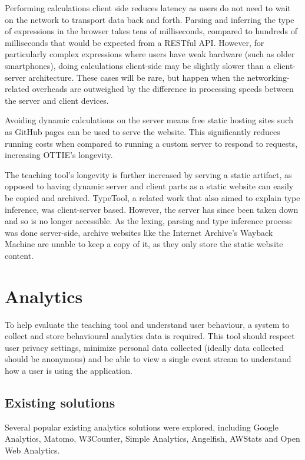 \documentclass[a4paper,fleqn,oneside,12pt]{report}
\begin{document}
Performing calculations client side reduces latency as users do not need to wait on the network to transport data back and forth. Parsing and inferring the type of expressions in the browser takes tens of milliseconds, compared to hundreds of milliseconds that would be expected from a RESTful API. However, for particularly complex expressions where users have weak hardware (such as older smartphones), doing calculations client-side may be slightly slower than a client-server architecture. These cases will be rare, but happen when the networking-related overheads are outweighed by the difference in processing speeds between the server and client devices.

Avoiding dynamic calculations on the server means free static hosting sites such as GitHub pages can be used to serve the website. This significantly reduces running costs when compared to running a custom server to respond to requests, increasing OTTIE's longevity.

The teaching tool’s longevity is further increased by serving a static artifact, as opposed to having dynamic server and client parts as a static website can easily be copied and archived. TypeTool, a related work that also aimed to explain type inference, was client-server based. However, the server has since been taken down and so is no longer accessible. As the lexing, parsing and type inference process was done server-side, archive websites like the Internet Archive’s Wayback Machine are unable to keep a copy of it, as they only store the static website content.

\section{Analytics}\label{id:h.60njhv340fb0}

To help evaluate the teaching tool and understand user behaviour, a system to collect and store behavioural analytics data is required. This tool should respect user privacy settings, minimize personal data collected (ideally data collected should be anonymous) and be able to view a single event stream to understand how a user is using the application.

\subsection{Existing solutions}

Several popular existing analytics solutions were explored, including Google Analytics, Matomo, W3Counter, Simple Analytics, Angelfish, AWStats and Open Web Analytics.
\end{document}
